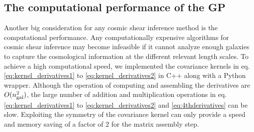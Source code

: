 
\subsection{The computational performance of the GP}
\label{subsec:computational_performance}
Another big consideration for any cosmic shear inference method is the 
computational performance.
Any computationally expensive algorithms for cosmic shear inference 
may become infeasible if it cannot analyze enough galaxies to 
capture the cosmological information at the different relevant length scales.
%  
To achieve a high computational speed, we  
implemented the covariance kernels in eq. \ref{eq:kernel_derivatives1} to
\ref{eq:kernel_derivatives2}
in {\sc C++} along with a {\sc Python} wrapper. 
Although the operation of computing and assembling the
derivatives are $O(n_{\rm gal}^2)$, the large number of addition and 
multiplication operations in eq. \ref{eq:kernel_derivatives1} to
\ref{eq:kernel_derivatives2} and \ref{eq:4thderivatives} can be slow.
Exploiting the symmetry of the covariance kernel can only provide 
a speed and memory saving of a factor of 2 for the matrix assembly step.

